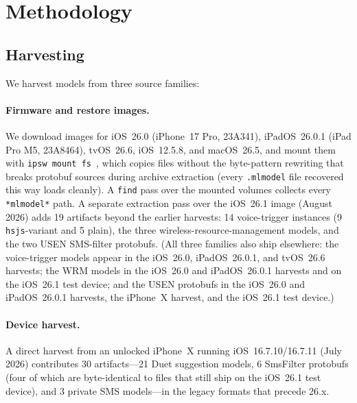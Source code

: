 \documentclass[letterpaper,twocolumn,10pt]{article}
\newcommand{\mlmodel}{\texttt{.mlmodel}\xspace}
\begin{document}
\section{Methodology}
\label{sec:method}

\subsection{Harvesting}
\label{sec:harvesting}

We harvest models from three source families:

\paragraph{Firmware and restore images.}
We download images for iOS~26.0 (iPhone~17 Pro, 23A341),
iPadOS~26.0.1 (iPad Pro M5, 23A8464), tvOS~26.6, iOS~12.5.8, and
macOS~26.5, and mount them with \texttt{ipsw mount fs}~\cite{ipsw_tool},
which copies files without the byte-pattern rewriting that breaks protobuf
sources during archive extraction (every \mlmodel{} file recovered this way
loads cleanly).
A \texttt{find} pass over the mounted volumes collects every
\texttt{*mlmodel*} path.
A separate extraction pass over the iOS~26.1 image (August 2026) adds 19
artifacts beyond the earlier harvests: 14 voice-trigger instances (9
\texttt{hsjs}-variant and 5 plain), the three wireless-resource-management
models, and the two USEN SMS-filter protobufs. (All three families also
ship elsewhere: the voice-trigger models appear in the iOS~26.0,
iPadOS~26.0.1, and tvOS~26.6 harvests; the WRM models in the iOS~26.0 and
iPadOS~26.0.1 harvests and on the iOS~26.1 test device; and the USEN
protobufs in the iOS~26.0 and iPadOS~26.0.1 harvests, the iPhone~X
harvest, and the iOS~26.1 test device.)

\paragraph{Device harvest.}
A direct harvest from an unlocked iPhone~X running iOS~16.7.10/16.7.11
(July 2026) contributes 30 artifacts---21 Duet suggestion models,
6 SmsFilter protobufs (four of which are byte-identical to files that
still ship on the iOS~26.1 test device), and 3 private SMS models---in
the legacy formats that precede 26.x.
\end{document}
